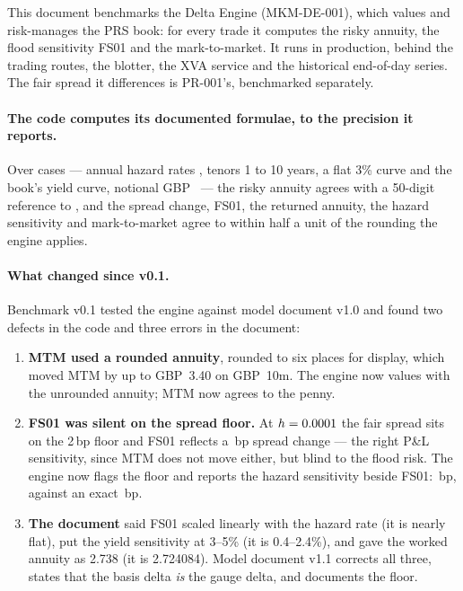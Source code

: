 \documentclass[11pt,a4paper]{article}
\begin{document}
\sloppy

\mkmtitlepage
\mkmlegalpage

\tableofcontents
\clearpage

\mkmexecsummary

This document benchmarks the Delta Engine (MKM-DE-001), which values and risk-manages
the PRS book: for every trade it computes the risky annuity, the flood sensitivity
FS01 and the mark-to-market. It runs in production, behind the trading routes, the
blotter, the XVA service and the historical end-of-day series. The fair spread it
differences is PR-001's, benchmarked separately.

\paragraph{The code computes its documented formulae, to the precision it reports.}
Over \bmCases{} cases --- annual hazard rates \bmRates, tenors 1 to 10 years, a flat
3\% curve and the book's yield curve, notional GBP~\bmNotional{} --- the risky annuity
agrees with a 50-digit reference to \bmAnnuity, and the spread change, FS01, the
returned annuity, the hazard sensitivity and mark-to-market agree to within half a
unit of the rounding the engine applies. \bmWolframConfirms

\paragraph{What changed since v0.1.} Benchmark v0.1 tested the engine against model
document v1.0 and found two defects in the code and three errors in the document:
\begin{enumerate}[leftmargin=*]
\item \textbf{MTM used a rounded annuity}, rounded to six places for display, which
  moved MTM by up to GBP~3.40 on GBP~10m. The engine now values with the unrounded
  annuity; MTM now agrees to the penny.
\item \textbf{FS01 was silent on the spread floor.} At $h=0.0001$ the fair spread
  sits on the 2\,bp floor and FS01 reflects a \bmFloorModel\,bp spread change ---
  the right P\&L sensitivity, since MTM does not move either, but blind to the flood
  risk. The engine now flags the floor and reports the hazard sensitivity beside
  FS01: \bmFloorHazard\,bp, against an exact \bmFloorGrad\,bp.
\item \textbf{The document} said FS01 scaled linearly with the hazard rate (it is
  nearly flat), put the yield sensitivity at 3--5\% (it is 0.4--2.4\%), and gave the
  worked annuity as 2.738 (it is 2.724084). Model document v1.1 corrects all three,
  states that the basis delta \emph{is} the gauge delta, and documents the floor.
\end{enumerate}
\end{document}
